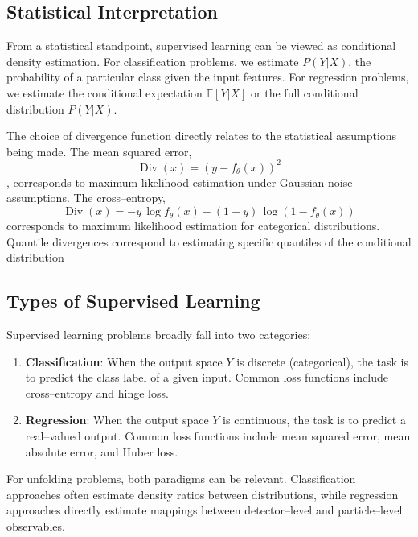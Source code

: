    \subsection{Statistical Interpretation}
    \label{subsec:supervised_learning.statistical_interpretation}
        From a statistical standpoint, supervised learning can be viewed as conditional density estimation.
        For classification problems, we estimate \(P(Y|X)\), the probability of a particular class given the input features.
        For regression problems, we estimate the conditional expectation \(\mathbb{E}[Y|X]\) or the full conditional distribution \(P(Y|X)\).

        The choice of divergence function directly relates to the statistical assumptions being made.
        The mean squared error, \[\operatorname{Div}(x) = (y - f_\theta(x))^2\], corresponds to maximum likelihood estimation under Gaussian noise assumptions. The cross--entropy, \[\operatorname{Div}(x) = -y\,\log f_\theta(x) - (1-y)\,\log(1 - f_\theta(x))\] corresponds to maximum likelihood estimation for categorical distributions.
        Quantile divergences correspond to estimating specific quantiles of the conditional distribution

    \subsection{Types of Supervised Learning}
        Supervised learning problems broadly fall into two categories:
        \begin{enumerate}
            \item \textbf{Classification}:
            When the output space \({Y}\) is discrete (categorical), the task is to predict the class label of a given input.
            Common loss functions include cross--entropy and hinge loss.
            \item \textbf{Regression}:
            When the output space \({Y}\) is continuous, the task is to predict a real--valued output.
            Common loss functions include mean squared error, mean absolute error, and Huber loss.
        \end{enumerate}
        For unfolding problems, both paradigms can be relevant.
        Classification approaches often estimate density ratios between distributions, while regression approaches directly estimate mappings between detector--level and particle--level observables.
